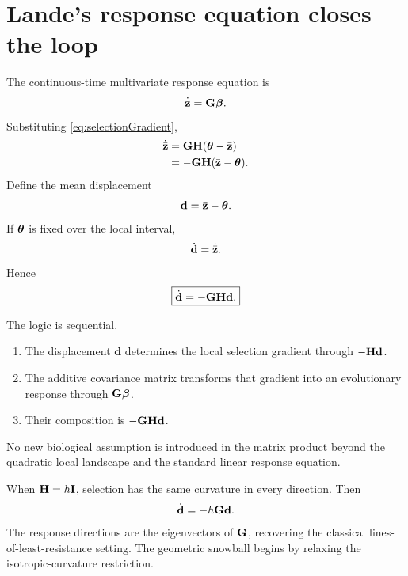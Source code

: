 \section{Lande's response equation closes the loop}

The continuous-time multivariate response equation is
\begin{equation}
\dot{\bar{\mathbf z}}=\mathbf{G}\boldsymbol{\beta}.
\label{eq:LandeContinuous}
\end{equation}
Substituting \cref{eq:selectionGradient},
\begin{align}
\dot{\bar{\mathbf z}}
&=\mathbf{G}\mathbf{H}(\boldsymbol{\theta}-\bar{\mathbf z})\\
&=-\mathbf{G}\mathbf{H}(\bar{\mathbf z}-\boldsymbol{\theta}).
\end{align}
Define the mean displacement
\begin{equation}
\mathbf d=\bar{\mathbf z}-\boldsymbol{\theta}.
\end{equation}
If \(\boldsymbol{\theta}\) is fixed over the local interval,
\begin{equation}
\dot{\mathbf d}=\dot{\bar{\mathbf z}}.
\end{equation}
Hence
\begin{equation}
\boxed{\dot{\mathbf d}=-\mathbf{G}\mathbf{H}\mathbf d.}
\label{eq:localDynamicsGH}
\end{equation}

\begin{derivationbox}
The logic is sequential.
\begin{enumerate}[leftmargin=1.6em]
\item The displacement \(\mathbf d\) determines the local selection gradient through \(-\mathbf{H}\mathbf d\).
\item The additive covariance matrix transforms that gradient into an evolutionary response through \(\mathbf{G}\boldsymbol{\beta}\).
\item Their composition is \(-\mathbf{G}\mathbf{H}\mathbf d\).
\end{enumerate}
No new biological assumption is introduced in the matrix product beyond the quadratic local landscape and the standard linear response equation.
\end{derivationbox}

\begin{connectionbox}
When \(\mathbf{H}=h\mathbf{I}\), selection has the same curvature in every direction. Then
\[
\dot{\mathbf d}=-h\mathbf{G}\mathbf d.
\]
The response directions are the eigenvectors of \(\mathbf{G}\), recovering the classical lines-of-least-resistance setting. The geometric snowball begins by relaxing the isotropic-curvature restriction.
\end{connectionbox}

